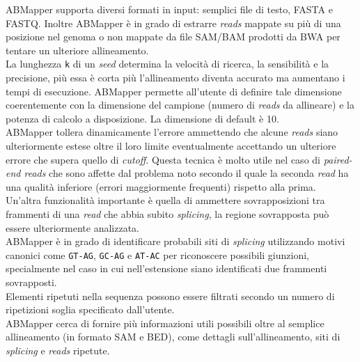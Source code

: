 \documentclass[conference]{IEEEtran}
\begin{document}
ABMapper supporta diversi formati in input: semplici file di testo, FASTA e FASTQ. Inoltre ABMapper è in grado di estrarre \textit{reads} mappate su più di una posizione nel genoma o non mappate da file SAM/BAM prodotti da BWA per tentare un ulteriore allineamento.\\

La lunghezza \texttt{k} di un \textit{seed} determina la velocità di ricerca, la sensibilità e la precisione, più essa è corta più l'allineamento diventa accurato ma aumentano i tempi di esecuzione. ABMapper permette all'utente di definire tale dimensione coerentemente con la dimensione del campione (numero di \textit{reads} da allineare) e la potenza di calcolo a disposizione. La dimensione di default è 10.\\

ABMapper tollera dinamicamente l'errore ammettendo che alcune \textit{reads} siano ulteriormente estese oltre il loro limite eventualmente accettando un ulteriore errore che supera quello di \textit{cutoff}. Questa tecnica è molto utile nel caso di \textit{paired-end reads} che sono affette dal problema noto secondo il quale la seconda \textit{read} ha una qualità inferiore (errori maggiormente frequenti) rispetto alla prima.\\ Un'altra funzionalità importante è quella di ammettere sovrapposizioni tra frammenti di una \textit{read} che abbia subito \textit{splicing}, la regione sovrapposta può essere ulteriormente analizzata.\\

ABMapper è in grado di identificare probabili siti di \textit{splicing} utilizzando motivi canonici come \texttt{GT-AG}, \texttt{GC-AG} e \texttt{AT-AC} per riconoscere possibili giunzioni, specialmente nel caso in cui nell'estensione siano identificati due frammenti sovrapposti.\\

Elementi ripetuti nella sequenza possono essere filtrati secondo un numero di ripetizioni soglia specificato dall'utente.\\

ABMapper cerca di fornire più informazioni utili possibili oltre al semplice allineamento (in formato SAM e BED), come dettagli sull'allineamento, siti di \textit{splicing} e \textit{reads} ripetute.
\end{document}

